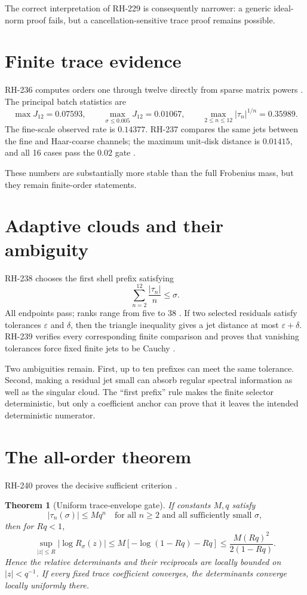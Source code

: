 \documentclass[11pt]{article}
\newtheorem{theorem}{Theorem}[section]
\theoremstyle{remark}
\begin{document}
The correct interpretation of RH-229 is consequently narrower: a generic
ideal-norm proof fails, but a cancellation-sensitive trace proof remains
possible.

\section{Finite trace evidence}

RH-236 computes orders one through twelve directly from sparse matrix powers
\citep{WangRH236}.  The principal batch statistics are
\[
 \max J_{12}=0.07593,
 \qquad
 \max_{\sigma\le0.005}J_{12}=0.01067,
 \qquad
 \max_{2\le n\le12}|\tau_n|^{1/n}=0.35989.
\]
The fine-scale observed rate is $0.14377$.  RH-237 compares the same jets
between the fine and Haar-coarse channels; the maximum unit-disk distance is
$0.01415$, and all 16 cases pass the $0.02$ gate \citep{WangRH237}.

These numbers are substantially more stable than the full Frobenius mass,
but they remain finite-order statements.

\section{Adaptive clouds and their ambiguity}

RH-238 chooses the first shell prefix satisfying
\[
 \sum_{n=2}^{12}\frac{|\tau_n|}{n}\le\sigma.
\]
All endpoints pass; ranks range from five to 38 \citep{WangRH238}.  If two
selected residuals satisfy tolerances $\varepsilon$ and $\delta$, then the
triangle inequality gives a jet distance at most $\varepsilon+\delta$.
RH-239 verifies every corresponding finite comparison and proves that
vanishing tolerances force fixed finite jets to be Cauchy
\citep{WangRH239}.

Two ambiguities remain.  First, up to ten prefixes can meet the same
tolerance.  Second, making a residual jet small can absorb regular spectral
information as well as the singular cloud.  The ``first prefix'' rule makes
the finite selector deterministic, but only a coefficient anchor can prove
that it leaves the intended deterministic numerator.

\section{The all-order theorem}

RH-240 proves the decisive sufficient criterion \citep{WangRH240}.

\begin{theorem}[Uniform trace-envelope gate]\label{thm:gate}
If constants $M,q$ satisfy
\[
 |\tau_n(\sigma)|\le Mq^n
 \quad\text{for all }n\ge2\text{ and all sufficiently small }\sigma,
\]
then for $Rq<1$,
\[
 \sup_{|z|\le R}|\log R_\sigma(z)|
 \le M[-\log(1-Rq)-Rq]
 \le \frac{M(Rq)^2}{2(1-Rq)}.
\]
Hence the relative determinants and their reciprocals are locally bounded on
$|z|<q^{-1}$.  If every fixed trace coefficient converges, the determinants
converge locally uniformly there.
\end{theorem}
\end{document}
